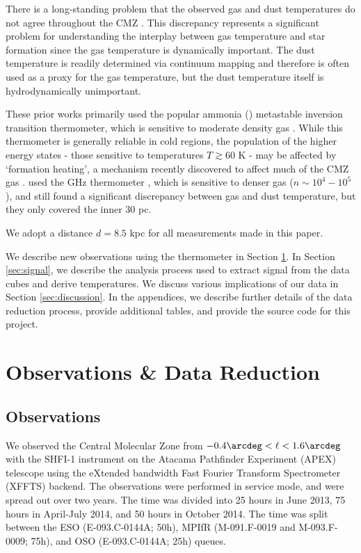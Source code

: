 There is a long-standing problem that the observed gas and dust temperatures do
not agree throughout the CMZ
\citep{Guesten1981a,Ao2013a,Ott2014a,Molinari2011a}.  This discrepancy
represents a significant problem for understanding the interplay between gas
temperature and star formation since the gas temperature is dynamically
important.  The dust temperature is readily determined via continuum mapping
and therefore is often used as a proxy for the gas temperature, but the dust
temperature itself is hydrodynamically unimportant.

These prior works primarily used the popular ammonia (\ammonia) metastable
inversion transition thermometer, which is sensitive to moderate density gas
\citep[$n(\hh) \sim 10^3-10^4$ \percc][]{Shirley2015a}.  While this thermometer is
generally reliable in cold regions, the population of the higher energy states
- those sensitive to temperatures $T\gtrsim60$ K - may be affected by
`formation heating', a mechanism recently discovered to affect much of the CMZ
gas \citep[][]{Lis2014a,Mills2013a}.  \citet{Ao2013a} used the  GHz
thermometer \citep{Mangum1993a}, which is sensitive to denser gas
($n\sim10^4-10^5$ \percc), and still found a significant discrepancy between
gas and dust temperature, but they only
covered the inner 30 pc.

We adopt a distance $d=8.5$ kpc for all measurements made in this paper.

We describe new observations using the \para thermometer in Section
\ref{sec:observations}.  In Section \ref{sec:signal}, we describe the analysis
process used to extract signal from the data cubes and derive temperatures.  We
discuss various implications of our data in Section \ref{sec:discussion}.  In
the appendices, we describe further details of the data reduction process,
provide additional tables, and provide the source code for this project.


\section{Observations \& Data Reduction}
\label{sec:observations}

\subsection{Observations}
We observed the Central Molecular Zone from $-0.4\arcdeg < \ell < 1.6\arcdeg$
with the SHFI-1 instrument \citep{Vassilev2008a} on the Atacama Pathfinder
Experiment (APEX) telescope using the eXtended bandwidth Fast Fourier Transform
Spectrometer (XFFTS) backend.  The observations were performed in service mode,
and were spread out over two years.  The time was divided into 25 hours in June
2013, 75 hours in April-July 2014, and 50 hours in October 2014.  The time was
split between the ESO (E-093.C-0144A; 50h), MPIfR (M-091.F-0019 and
M-093.F-0009; 75h), and OSO (E-093.C-0144A; 25h) queues.

